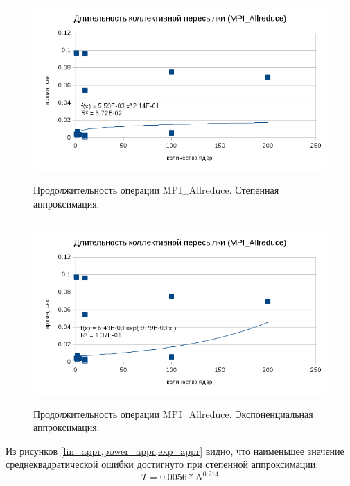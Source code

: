         
        \begin{figure}[htb]
        	\begin{center}
        		\includegraphics[height=7cm,keepaspectratio]{images/RomanenkoAASnytnikovAVChernykhIGadaptationtosupercomputerfinalEXTENDEDREFERENCES-img3.png}
        	\end{center}
        	\caption{Продолжительность операции MPI\_Allreduce. Степенная аппроксимация.}
        	\label{power_appr}
        \end{figure}
        
       
       
       \begin{figure}[htb]
       	\begin{center}
       		\includegraphics[height=7cm,keepaspectratio]{images/RomanenkoAASnytnikovAVChernykhIGadaptationtosupercomputerfinalEXTENDEDREFERENCES-img4.png}
       	\end{center}
       	\caption{Продолжительность операции MPI\_Allreduce. Экспоненциальная аппроксимация.}
       	\label{exp_appr}
       \end{figure} 
        Из рисунков \ref{lin_appr,power_appr,exp_appr} видно, что наименьшее значение среднеквадратической ошибки достигнуто при степенной аппроксимации:
        $$
        T = 0.0056*N^{0.214}
        $$
        \clearpage
        
